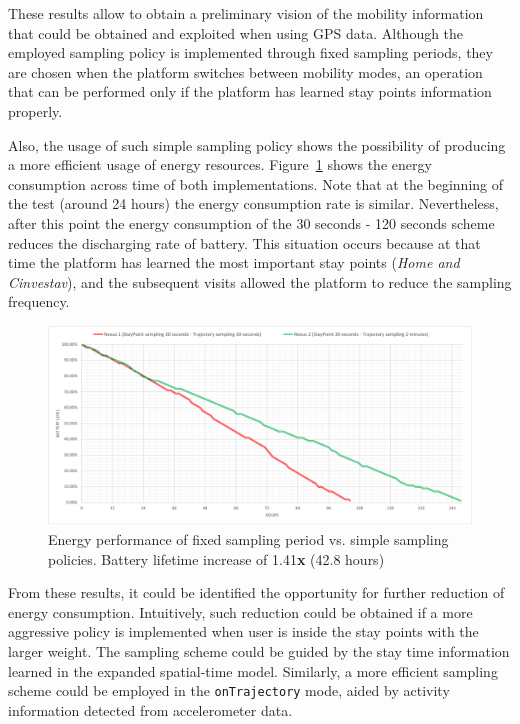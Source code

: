 \documentclass[ENG,PhD]{cinvestav}
\begin{document}
These results allow to obtain a preliminary vision of the mobility information that could be obtained and exploited when using GPS data.
Although the employed sampling policy is implemented through fixed sampling periods, they are chosen when the platform switches between mobility modes, an operation that can be performed only if the platform has learned stay points information properly.

Also, the usage of such simple sampling policy shows the possibility of producing a more efficient usage of energy resources.
Figure~\ref{fig:energy-performance-early-integral-test} shows the energy consumption across time of both implementations.
Note that at the beginning of the test (around 24 hours) the energy consumption rate is similar.
Nevertheless, after this point the energy consumption of the 30 seconds - 120 seconds scheme reduces the discharging rate of battery.
This situation occurs because at that time the platform has learned the most important stay points (\emph{Home and Cinvestav}), and the subsequent visits allowed the platform to reduce the sampling frequency.

 \begin{figure}
  \centering
  \includegraphics[width=\columnwidth]{vectors/energy-performance-early-integral-test}
  \caption{Energy performance of fixed sampling period vs. simple sampling policies. Battery lifetime increase of 1.41\textbf{x} (42.8 hours)}
  \label{fig:energy-performance-early-integral-test}
\end{figure}

From these results, it could be identified the opportunity for further reduction of energy consumption.
Intuitively, such reduction could be obtained if a more aggressive policy is implemented when user is inside the stay points with the larger weight.
The sampling scheme could be guided by the stay time information learned in the expanded spatial-time model.
Similarly, a more efficient sampling scheme could be employed in the \texttt{onTrajectory} mode, aided by activity information detected from accelerometer data.
\end{document}
